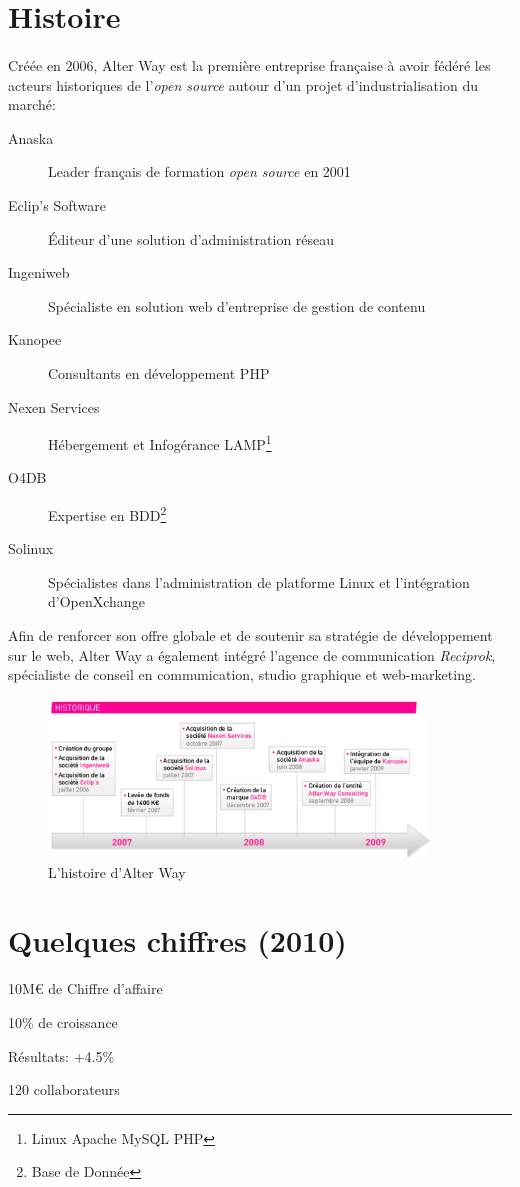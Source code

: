 \section{Histoire}
\paragraph*{}
	Créée en 2006, Alter Way est la première entreprise française à avoir fédéré les acteurs historiques
	de l'\emph{open source} autour d'un projet d'industrialisation du marché:

	\begin{description}
		\item[Anaska] Leader français de formation \emph{open source} en 2001
		\item[Eclip's Software] Éditeur d'une solution d'administration réseau
		\item[Ingeniweb] Spécialiste en solution web d'entreprise de gestion de contenu
		\item[Kanopee] Consultants en développement PHP
		\item[Nexen Services] Hébergement et Infogérance LAMP\footnote{Linux Apache MySQL PHP}
		\item[O4DB] Expertise en BDD\footnote{Base de Donnée}
		\item[Solinux] Spécialistes dans l'administration de platforme Linux et l'intégration d'OpenXchange
	\end{description}

	Afin de renforcer son offre globale et de soutenir sa stratégie de développement sur le web, Alter Way
	a également intégré l'agence de communication \emph{Reciprok}, spécialiste de conseil en communication,
	studio graphique et web-marketing.

	\begin{figure}
		\centering
		\includegraphics[width=0.9\textwidth]{resource/img/historique_aw}
		\caption{L'histoire d'Alter Way}
	\end{figure}

\section{Quelques chiffres (2010)}
 \begin{listi}
		\item 10M\euro{} de Chiffre d'affaire
		\item 10\% de croissance
		\item Résultats: +4.5\%
		\item 120 collaborateurs
 \end{listi}

